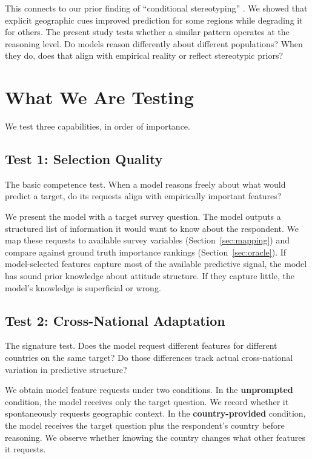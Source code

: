 \documentclass[11pt]{article}
\begin{document}
This connects to our prior finding of ``conditional stereotyping'' \citep{paper1}. We showed that explicit geographic cues improved prediction for some regions while degrading it for others. The present study tests whether a similar pattern operates at the reasoning level. Do models reason differently about different populations? When they do, does that align with empirical reality or reflect stereotypic priors?


\section{What We Are Testing}
\label{sec:what}

We test three capabilities, in order of importance.

\subsection{Test 1: Selection Quality}

The basic competence test. When a model reasons freely about what would predict a target, do its requests align with empirically important features?

We present the model with a target survey question. The model outputs a structured list of information it would want to know about the respondent. We map these requests to available survey variables (Section~\ref{sec:mapping}) and compare against ground truth importance rankings (Section~\ref{sec:oracle}). If model-selected features capture most of the available predictive signal, the model has sound prior knowledge about attitude structure. If they capture little, the model's knowledge is superficial or wrong.

\subsection{Test 2: Cross-National Adaptation}

The signature test. Does the model request different features for different countries on the same target? Do those differences track actual cross-national variation in predictive structure?

We obtain model feature requests under two conditions. In the \textbf{unprompted} condition, the model receives only the target question. We record whether it spontaneously requests geographic context. In the \textbf{country-provided} condition, the model receives the target question plus the respondent's country before reasoning. We observe whether knowing the country changes what other features it requests.
\end{document}
